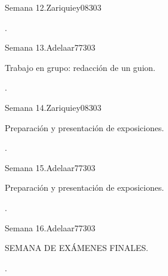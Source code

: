 \begin{syllabus}
\begin{unit}{}{Semana 12.}{Zariquiey08}{30}{3}
   \begin{learningoutcomes}
      \item .
   \end{learningoutcomes}
\end{unit}

\begin{unit}{}{Semana 13.}{Adelaar77}{30}{3}
   \begin{topics}
      \item Trabajo en grupo: redacción de un guion.
   \end{topics}

   \begin{learningoutcomes}
      \item .
   \end{learningoutcomes}
\end{unit}

\begin{unit}{}{Semana 14.}{Zariquiey08}{30}{3}
   \begin{topics}
      \item Preparación y presentación de exposiciones.
   \end{topics}

   \begin{learningoutcomes}
      \item .
   \end{learningoutcomes}
\end{unit}

\begin{unit}{}{Semana 15.}{Adelaar77}{30}{3}
   \begin{topics}
      \item Preparación y presentación de exposiciones.
   \end{topics}

   \begin{learningoutcomes}
      \item .
   \end{learningoutcomes}
\end{unit}

\begin{unit}{}{Semana 16.}{Adelaar77}{30}{3}
   \begin{topics}
      \item SEMANA DE EXÁMENES FINALES.
   \end{topics}

   \begin{learningoutcomes}
      \item .
   \end{learningoutcomes}
\end{unit}



\begin{coursebibliography}
\end{coursebibliography}

\end{syllabus}
